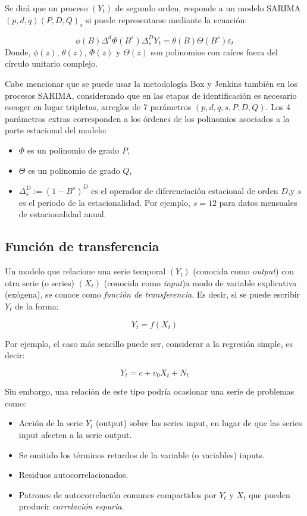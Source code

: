 \documentclass[12pt,oneside]{book}\usepackage[]{graphicx}\usepackage[]{color}
\theoremstyle{definition} %
\begin{document}
\begin{definicion}
Se dirá que un proceso $(Y_t)$ de segundo orden,  responde a un modelo SARIMA$(p,d,q)(P,D,Q)_s$ si puede representarse mediante la ecuación:

\begin{equation}
\phi  (B)\Delta^d \Phi (B^s) \Delta _s^DY_t = \theta  (B) \Theta (B^s)\varepsilon_t
\label{eq:sarima_def}
\end{equation}
Donde, $\phi (z)$, $\theta (z)$, $\Phi (z)$ y $\Theta (z)$ son polinomios con raíces fuera del círculo unitario complejo.

\end{definicion}

Cabe mencionar que se puede usar la metodología Box y Jenkins también en los procesos SARIMA, considerando que en las etapas de identificación es necesario escoger en lugar tripletas, arreglos de 7 parámetros $(p,d,q,s,P,D,Q)$. 
Los 4 parámetros extras corresponden a los órdenes de los polinomios asociados a la parte estacional del modelo: 

\begin{itemize}
\item $\Phi $ es un polinomio de grado $P$,
\item $\Theta $ es un polinomio de grado $Q$,
\item $\Delta _s^D:=(1-B^s)^D$ es el operador de diferenciación estacional de orden $D$,y $s$ es el periodo de la estacionalidad.  Por ejemplo, $s=12$ para datos mensuales de estacionalidad anual.
\end{itemize}


\subsection{Función de transferencia}

Un modelo que relacione una serie temporal $(Y_t)$ (conocida como \textit{output}) con otra serie (o series) $(X_t)$ (conocida como \textit{input})a modo de variable explicativa (exógena), se conoce como \textit{función de transferencia}. Es decir, si se puede escribir $Y_t$ de la forma:

$$Y_t= f(X_t)$$

Por ejemplo, el caso más sencillo puede ser, considerar a la regresión simple, es decir:

$$Y_t = c + v_0X_t + N_t$$

Sin embargo, una relación de este tipo podría ocasionar una serie de problemas como:
\begin{itemize}
\item Acción de la serie $Y_t$ (output) sobre las series input, en lugar de que las series input afecten a la serie output.
\item Se omitido los términos retardos de la variable (o variables) inputs.
\item Residuos autocorrelacionados.
\item Patrones de autocorrelación comunes compartidos por $Y_t$ y $X_t$ que pueden producir \textit{correlación espuria}.
\end{itemize}
\end{document}
